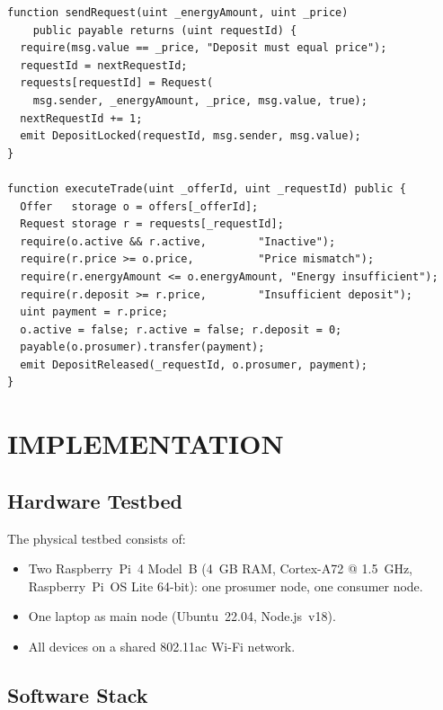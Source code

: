 \documentclass{IEEEoj}
\begin{document}
\begin{lstlisting}[language=Solidity,
  caption={DepositLock: request submission and trade execution},
  label={lst:contract},
  basicstyle=\footnotesize\ttfamily, breaklines=true]
function sendRequest(uint _energyAmount, uint _price)
    public payable returns (uint requestId) {
  require(msg.value == _price, "Deposit must equal price");
  requestId = nextRequestId;
  requests[requestId] = Request(
    msg.sender, _energyAmount, _price, msg.value, true);
  nextRequestId += 1;
  emit DepositLocked(requestId, msg.sender, msg.value);
}

function executeTrade(uint _offerId, uint _requestId) public {
  Offer   storage o = offers[_offerId];
  Request storage r = requests[_requestId];
  require(o.active && r.active,        "Inactive");
  require(r.price >= o.price,          "Price mismatch");
  require(r.energyAmount <= o.energyAmount, "Energy insufficient");
  require(r.deposit >= r.price,        "Insufficient deposit");
  uint payment = r.price;
  o.active = false; r.active = false; r.deposit = 0;
  payable(o.prosumer).transfer(payment);
  emit DepositReleased(_requestId, o.prosumer, payment);
}
\end{lstlisting}


\section{IMPLEMENTATION}
\label{sec:implementation}

\subsection{Hardware Testbed}

The physical testbed consists of:
\begin{itemize}
  \item Two Raspberry~Pi~4 Model~B (4~GB RAM, Cortex-A72 @ 1.5~GHz,
        Raspberry~Pi~OS Lite 64-bit): one prosumer node, one consumer node.
  \item One laptop as main node (Ubuntu~22.04, Node.js~v18).
  \item All devices on a shared 802.11ac Wi-Fi network.
\end{itemize}

\subsection{Software Stack}
\end{document}
